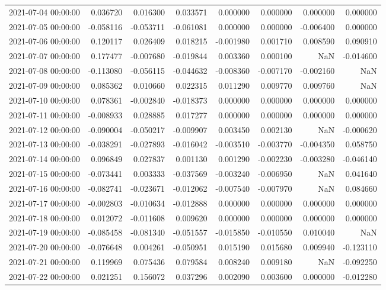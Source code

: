 \begin{tabular}{lrrrrrrr}
2021-07-04 00:00:00 & 0.036720 & 0.016300 & 0.033571 & 0.000000 & 0.000000 & 0.000000 & 0.000000 \\
2021-07-05 00:00:00 & -0.058116 & -0.053711 & -0.061081 & 0.000000 & 0.000000 & -0.006400 & 0.000000 \\
2021-07-06 00:00:00 & 0.120117 & 0.026409 & 0.018215 & -0.001980 & 0.001710 & 0.008590 & 0.090910 \\
2021-07-07 00:00:00 & 0.177477 & -0.007680 & -0.019844 & 0.003360 & 0.000100 & NaN & -0.014600 \\
2021-07-08 00:00:00 & -0.113080 & -0.056115 & -0.044632 & -0.008360 & -0.007170 & -0.002160 & NaN \\
2021-07-09 00:00:00 & 0.085362 & 0.010660 & 0.022315 & 0.011290 & 0.009770 & 0.009760 & NaN \\
2021-07-10 00:00:00 & 0.078361 & -0.002840 & -0.018373 & 0.000000 & 0.000000 & 0.000000 & 0.000000 \\
2021-07-11 00:00:00 & -0.008933 & 0.028885 & 0.017277 & 0.000000 & 0.000000 & 0.000000 & 0.000000 \\
2021-07-12 00:00:00 & -0.090004 & -0.050217 & -0.009907 & 0.003450 & 0.002130 & NaN & -0.000620 \\
2021-07-13 00:00:00 & -0.038291 & -0.027893 & -0.016042 & -0.003510 & -0.003770 & -0.004350 & 0.058750 \\
2021-07-14 00:00:00 & 0.096849 & 0.027837 & 0.001130 & 0.001290 & -0.002230 & -0.003280 & -0.046140 \\
2021-07-15 00:00:00 & -0.073441 & 0.003333 & -0.037569 & -0.003240 & -0.006950 & NaN & 0.041640 \\
2021-07-16 00:00:00 & -0.082741 & -0.023671 & -0.012062 & -0.007540 & -0.007970 & NaN & 0.084660 \\
2021-07-17 00:00:00 & -0.002803 & -0.010634 & -0.012888 & 0.000000 & 0.000000 & 0.000000 & 0.000000 \\
2021-07-18 00:00:00 & 0.012072 & -0.011608 & 0.009620 & 0.000000 & 0.000000 & 0.000000 & 0.000000 \\
2021-07-19 00:00:00 & -0.085458 & -0.081340 & -0.051557 & -0.015850 & -0.010550 & 0.010040 & NaN \\
2021-07-20 00:00:00 & -0.076648 & 0.004261 & -0.050951 & 0.015190 & 0.015680 & 0.009940 & -0.123110 \\
2021-07-21 00:00:00 & 0.119969 & 0.075436 & 0.079584 & 0.008240 & 0.009180 & NaN & -0.092250 \\
2021-07-22 00:00:00 & 0.021251 & 0.156072 & 0.037296 & 0.002090 & 0.003600 & 0.000000 & -0.012280 \\

\end{tabular}
